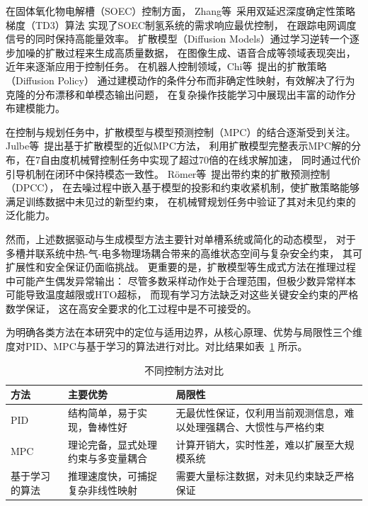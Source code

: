 在固体氧化物电解槽（SOEC）控制方面，
Zhang等~\cite{Zhang2025TEC}采用双延迟深度确定性策略梯度（TD3）算法
实现了SOEC制氢系统的需求响应最优控制，
在跟踪电网调度信号的同时保持高能量效率。
扩散模型（Diffusion Models）通过学习逆转一个逐步加噪的扩散过程来生成高质量数据，
在图像生成、语音合成等领域表现突出，近年来逐渐应用于控制任务。
在机器人控制领域，Chi等~\cite{Chi2023DiffusionPolicy}提出的扩散策略（Diffusion Policy）
通过建模动作的条件分布而非确定性映射，有效解决了行为克隆的分布漂移和单模态输出问题，
在复杂操作技能学习中展现出丰富的动作分布建模能力。

在控制与规划任务中，扩散模型与模型预测控制（MPC）的结合逐渐受到关注。
Julbe等~\cite{Julbe2025AMPC}提出基于扩散模型的近似MPC方法，
利用扩散模型完整表示MPC解的分布，在7自由度机械臂控制任务中实现了超过70倍的在线求解加速，
同时通过代价引导机制在闭环中保持模态一致性。
R{\"o}mer等~\cite{Roemer2025DPCC}提出带约束的扩散预测控制（DPCC），
在去噪过程中嵌入基于模型的投影和约束收紧机制，使扩散策略能够满足训练数据中未见过的新型约束，
在机械臂规划任务中验证了其对未见约束的泛化能力。

然而，上述数据驱动与生成模型方法主要针对单槽系统或简化的动态模型，
对于多槽并联系统中热-气-电多物理场耦合带来的高维状态空间与复杂安全约束，
其可扩展性和安全保证仍面临挑战。
更重要的是，扩散模型等生成式方法在推理过程中可能产生偶发异常输出：
尽管多数采样动作处于合理范围，但极少数异常样本可能导致温度越限或HTO超标，
而现有学习方法缺乏对这些关键安全约束的严格数学保证，
这在高安全要求的化工过程中是不可接受的。

为明确各类方法在本研究中的定位与适用边界，从核心原理、优势与局限性三个维度对PID、MPC与基于学习的算法进行对比。对比结果如表~\ref{tab:method_comparison} 所示。

\begin{table}[!htbp]
  \centering
  \caption{不同控制方法对比}
  \label{tab:method_comparison}
  \begin{tabular}{@{}l >{\raggedright\arraybackslash}p{4.5cm} >{\raggedright\arraybackslash}p{5.5cm}@{}}
    \toprule
    \textbf{方法} & \textbf{主要优势} & \textbf{局限性} \\
    \midrule
    PID & 结构简单，易于实现，鲁棒性好 & 无最优性保证，仅利用当前观测信息，难以处理强耦合、大惯性与严格约束 \\
    \addlinespace
    MPC & 理论完备，显式处理约束与多变量耦合 & 计算开销大，实时性差，难以扩展至大规模系统 \\
    \addlinespace
    基于学习的算法 & 推理速度快，可捕捉复杂非线性映射 & 需要大量标注数据，对未见约束缺乏严格保证 \\
    \bottomrule
  \end{tabular}
\end{table}

